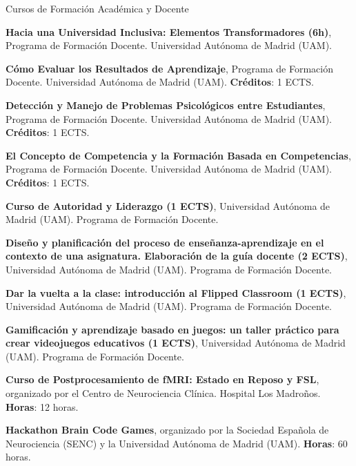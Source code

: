 \begin{rubric}{Cursos de Formación Académica y Docente}
	
	\entry*[9-11 de mayo de 2022] \textbf{Hacia una Universidad Inclusiva: Elementos Transformadores (6h)}, Programa de Formación Docente. Universidad Autónoma de Madrid (UAM).
	
	
	\entry*[15-17 de febrero de 2023] \textbf{Cómo Evaluar los Resultados de Aprendizaje}, Programa de Formación Docente. Universidad Autónoma de Madrid (UAM). \textbf{Créditos}: 1 ECTS.
	
	\entry*[20-27 de abril de 2023] \textbf{Detección y Manejo de Problemas Psicológicos entre Estudiantes}, Programa de Formación Docente. Universidad Autónoma de Madrid (UAM). \textbf{Créditos}: 1 ECTS.
	
	\entry*[17-24 de octubre de 2023] \textbf{El Concepto de Competencia y la Formación Basada en Competencias}, Programa de Formación Docente. Universidad Autónoma de Madrid (UAM). \textbf{Créditos}: 1 ECTS.
	
	\entry*[19-20 de febrero de 2024] \textbf{Curso de Autoridad y Liderazgo (1 ECTS)}, Universidad Autónoma de Madrid (UAM). Programa de Formación Docente.
 
	\entry*[19-20 de febrero de 2024] \textbf{Diseño y planificación del proceso de enseñanza-aprendizaje en el contexto de una asignatura. Elaboración de la guía docente (2 ECTS)}, Universidad Autónoma de Madrid (UAM). Programa de Formación Docente.

 \entry*[23, 30 de octubre de 2024] \textbf{Dar la vuelta a la clase: introducción al Flipped Classroom  (1 ECTS)}, Universidad Autónoma de Madrid (UAM). Programa de Formación Docente.
 
  \entry*[18, 25 de octubre de 2024] \textbf{Gamificación y aprendizaje basado en juegos: un taller práctico para crear videojuegos educativos  (1 ECTS)}, Universidad Autónoma de Madrid (UAM). Programa de Formación Docente.
	
	
	\entry*[Febrero 2024] \textbf{Curso de Postprocesamiento de fMRI: Estado en Reposo y FSL}, organizado por el Centro de Neurociencia Clínica. Hospital Los Madroños. \textbf{Horas}: 12 horas.
	
	\entry*[Octubre 2021] \textbf{Hackathon Brain Code Games}, organizado por la Sociedad Española de Neurociencia (SENC) y la Universidad Autónoma de Madrid (UAM). \textbf{Horas}: 60 horas.
	

\end{rubric}
